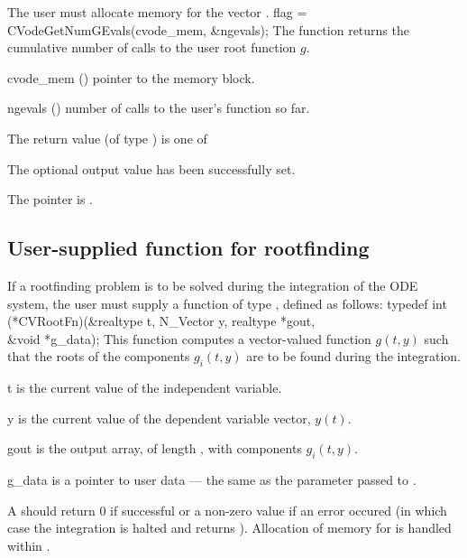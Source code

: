 {
  {\warn}The user must allocate memory for the vector .
}
{
  flag = CVodeGetNumGEvals(cvode\_mem, \&ngevals);
}
{
  The function  returns the cumulative
  number of calls to the user root function $g$.
}
{
  \begin{args}
  \item[cvode\_mem] ()
    pointer to the {\cvode} memory block.
  \item[ngevals] ()
    number of calls to the user's function  so far.
  \end{args}
}
{
  The return value  (of type ) is one of
  \begin{args}
  \item[\Id{CV\_SUCCESS}] 
    The optional output value has been successfully set.
  \item[\Id{CV\_MEM\_NULL}]
    The  pointer is .
  \end{args}
}
{}

\subsection{User-supplied function for rootfinding}\label{ss:root_us}

If a rootfinding problem is to be solved during the integration of the ODE system,
the user must supply a {\C} function of type , defined as follows:
{
  typedef int (*CVRootFn)(&realtype t, N\_Vector y, realtype *gout, \\
                          &void *g\_data);
}
{
  This function computes a vector-valued function $g(t,y)$ such that the roots of
  the  components $g_i(t,y)$ are to be found during the integration.
}
{
  \begin{args}[g\_data]
  \item[t]
    is the current value of the independent variable.
  \item[y]
    is the current value of the dependent variable vector, $y(t)$.
  \item[gout]
    is the output array, of length , with components $g_i(t,y)$.
  \item[g\_data]
    is a pointer to user data --- the same as the       
    parameter passed to .   
  \end{args}
}
{
  A  should return 0 if successful or a non-zero value if
  an error occured (in which case the integration is halted and  returns
  ).
}
{
  Allocation of memory for  is handled within {\cvode}.
}

